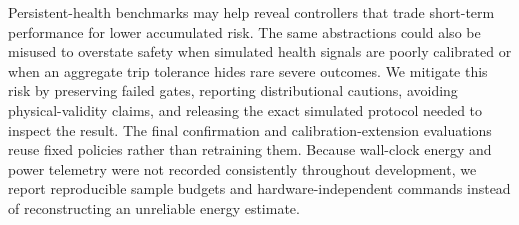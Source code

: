 Persistent-health benchmarks may help reveal controllers that trade short-term
performance for lower accumulated risk. The same abstractions could also be
misused to overstate safety when simulated health signals are poorly calibrated
or when an aggregate trip tolerance hides rare severe outcomes. We mitigate
this risk by preserving failed gates, reporting distributional cautions,
avoiding physical-validity claims, and releasing the exact simulated protocol
needed to inspect the result. The final confirmation and calibration-extension
evaluations reuse fixed policies rather than retraining them. Because
wall-clock energy and power telemetry were not recorded consistently throughout
development, we report reproducible sample budgets and hardware-independent
commands instead of reconstructing an unreliable energy estimate.
